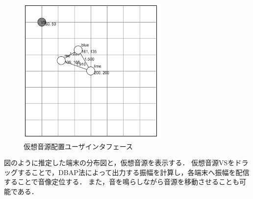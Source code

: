 \begin{figure}[p]\centering
  \hspace{-2mm}\includegraphics[clip,width=1.1\hsize]{img/relpos.png}
  \caption{仮想音源配置ユーザインタフェース}\label{fig:relpos}
\end{figure}

図のように推定した端末の分布図と，仮想音源を表示する．
仮想音源VSをドラッグすることで，DBAP法によって出力する振幅を計算し，各端末へ振幅を配信することで音像定位する．
また，音を鳴らしながら音源を移動させることも可能である．
